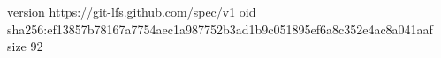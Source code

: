 version https://git-lfs.github.com/spec/v1
oid sha256:ef13857b78167a7754aec1a987752b3ad1b9c051895ef6a8c352e4ac8a041aaf
size 92
